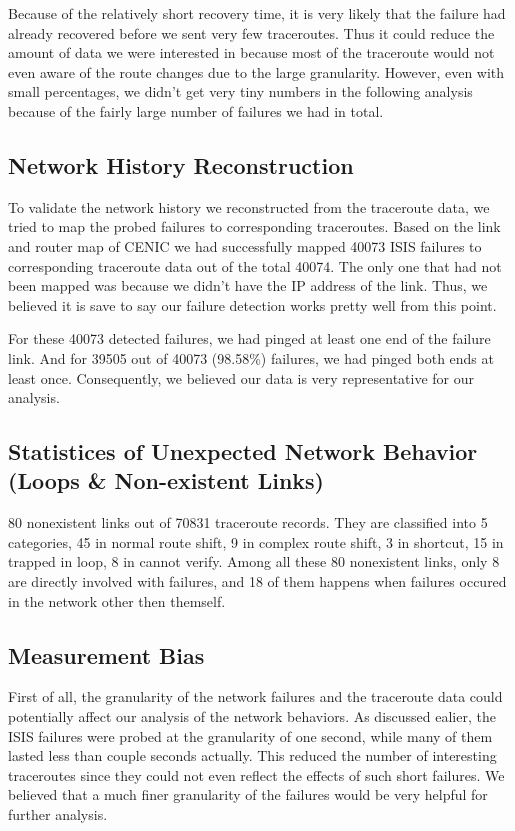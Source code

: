 \documentclass[conference, twocolumn, oneside, 10pt]{IEEEtran}
\begin{document}
Because of the relatively short recovery time, it is very likely that the failure had already recovered before we sent very few traceroutes. Thus it could reduce the amount of data we were interested in because most of the traceroute would not even aware of the route changes due to the large granularity. However, even with small percentages, we didn't get very tiny numbers in the following analysis because of the fairly large number of failures we had in total.

\subsection{Network History Reconstruction}

To validate the network history we reconstructed from the traceroute data, we tried to map the probed failures to corresponding traceroutes. Based on the link and router map of CENIC we had successfully mapped 40073 ISIS failures to corresponding traceroute data out of the total 40074. The only one that had not been mapped was because we didn't have the IP address of the link. Thus, we believed it is save to say our failure detection works pretty well from this point.

For these 40073 detected failures, we had pinged at least one end of the failure link. And for 39505 out of 40073 (98.58\%) failures, we had pinged both ends at least once. Consequently, we believed our data is very representative for our analysis.

\subsection{Statistices of Unexpected Network Behavior (Loops \& Non-existent Links)}
80 nonexistent links out of 70831 traceroute records. They are classified into 5 categories,  45 in normal route shift, 9 in complex route shift, 3 in shortcut, 15 in trapped in loop, 8 in cannot verify. Among all these 80 nonexistent links, only 8 are directly involved with failures, and 18 of them happens when failures occured in the network other then themself. 

\subsection{Measurement Bias}

First of all, the granularity of the network failures and the traceroute data could potentially affect our analysis of the network behaviors. As discussed ealier, the ISIS failures were probed at the granularity of one second, while many of them lasted less than couple seconds actually. This reduced the number of interesting traceroutes since they could not even reflect the effects of such short failures. We believed that a much finer granularity of the failures would be very helpful for further analysis.
\end{document}
